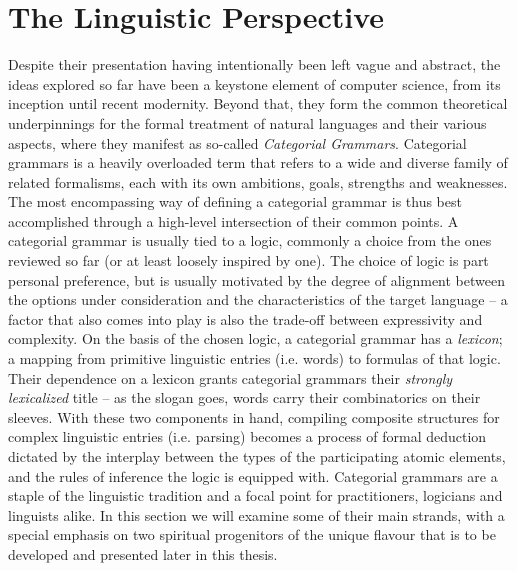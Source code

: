 \section{The Linguistic Perspective}\label{section:linguistics}
Despite their presentation having intentionally been left vague and abstract, the ideas explored so far have been a keystone element of computer science, from its inception until recent modernity.
Beyond that, they form the common theoretical underpinnings for the formal treatment of natural languages and their various aspects, where they manifest as so-called \textit{Categorial Grammars}.
Categorial grammars is a heavily overloaded term that refers to a wide and diverse family of related formalisms, each with its own ambitions, goals, strengths and weaknesses.
The most encompassing way of defining a categorial grammar is thus best accomplished through a high-level intersection of their common points.
A categorial grammar is usually tied to a logic, commonly a choice from the ones reviewed so far (or at least loosely inspired by one).
The choice of logic is part personal preference, but is usually motivated by the degree of alignment between the options under consideration and the characteristics of the target language -- a factor that also comes into play is also the trade-off between expressivity and complexity.
On the basis of the chosen logic, a categorial grammar has a \textit{lexicon}; a mapping from primitive linguistic entries (i.e. words) to formulas of that logic.
Their dependence on a lexicon grants categorial grammars their \textit{strongly lexicalized} title -- as the slogan goes, words carry their combinatorics on their sleeves.
With these two components in hand, compiling composite structures for complex linguistic entries (i.e. parsing) becomes a process of formal deduction dictated by the interplay between the types of the participating atomic elements, and the rules of inference the logic is equipped with.
Categorial grammars are a staple of the linguistic tradition and a focal point for practitioners, logicians and linguists alike. 
In this section we will examine some of their main strands, with a special emphasis on two spiritual progenitors of the unique flavour that is to be developed and presented later in this thesis.


